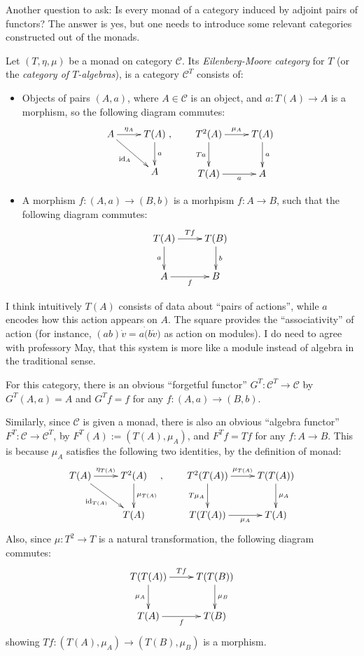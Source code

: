 \documentclass{article}
\begin{document}
\hfil

Another question to ask: Is every monad of a category induced by adjoint pairs of functors? The answer is yes, but one needs to introduce some relevant categories constructed out of the monads.

\begin{defn}
    Let $(T,\eta, \mu)$ be a monad on category $\mathcal{C}$. Its \emph{Eilenberg-Moore category} for $T$ (or the \emph{category of $T$-algebras}), is a category $\mathcal{C}^T$ consists of:
    \begin{itemize}
        \item Objects of pairs $(A,a)$, where $A\in\mathcal{C}$ is an object, and $a:T(A)\rightarrow A$ is a morphism, so the following diagram commutes:
        \[\xymatrix{
            A \ar[dr]_-{\id_A} \ar[r]^-{\eta_A} & T(A) \ar[d]^-{a}\\
            & A
        },\quad\quad \xymatrix{
            T^2(A) \ar[r]^-{\mu_A} \ar[d]_-{Ta} & T(A) \ar[d]^-{a}\\
            T(A) \ar[r]_-{a} & A
        }\]
        \item A morphism $f:(A,a)\rightarrow (B,b)$ is a morhpism $f:A\rightarrow B$, such that the following diagram commutes:
        \[\xymatrix{
            T(A) \ar[d]_-{a} \ar[r]^-{Tf} & T(B)\ar[d]^-{b}\\
            A \ar[r]_-{f} & B
        }\]
    \end{itemize}
\end{defn}

I think intuitively $T(A)$ consists of data about ``pairs of actions'', while $a$ encodes how this action appears on $A$. The square provides the ``associativity'' of action (for instance, $(ab)\dot v = a\dot (b\dot v)$ as action on modules). I do need to agree with professory May, that this system is more like a module instead of algebra in the traditional sense.

\hfil

For this category, there is an obvious ``forgetful functor'' $G^T:\mathcal{C}^T\rightarrow \mathcal{C}$ by $G^T (A,a) = A$ and $G^T f = f$ for any $f:(A,a)\rightarrow (B,b)$. 

Similarly, since $\mathcal{C}$ is given a monad, there is also an obvious ``algebra functor'' $F^T:\mathcal{C}\rightarrow \mathcal{C}^T$, by $F^T(A) := (T(A),\mu_A)$, and $F^Tf = Tf$ for any $f:A\rightarrow B$. This is because $\mu_A$ satisfies the following two identities, by the definition of monad:
\[\xymatrix{
    T(A) \ar[dr]_-{\id_{T(A)}} \ar[r]^-{\eta_{T(A)}} & T^2(A) \ar[d]^-{\mu_{T(A)}}\\
    & T(A)
},\quad\quad \xymatrix{
    T^2(T(A)) \ar[r]^-{\mu_{T(A)}} \ar[d]_-{T\mu_A} & T(T(A)) \ar[d]^-{\mu_A}\\
    T(T(A)) \ar[r]_-{\mu_A} & T(A)
}\]
Also, since $\mu:T^2\rightarrow T$ is a natural transformation, the following diagram commutes:
\[\xymatrix{
    T(T(A)) \ar[d]_-{\mu_A} \ar[r]^-{Tf} & T(T(B))\ar[d]^-{\mu_B}\\
    T(A) \ar[r]_-{f} & T(B)
}\]
showing $Tf:(T(A),\mu_A)\rightarrow (T(B),\mu_B)$ is a morphism.
\end{document}
